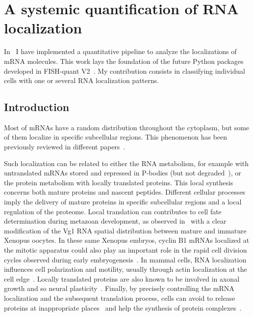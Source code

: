 \section{A systemic quantification of RNA localization}
\label{sec:general_pattern_recognition}

In~\cite{CHOUAIB_2020} I have implemented a quantitative pipeline to analyze the localizations of \ac{mRNA} molecules.
This work lays the foundation of the future Python packages developed in FISH-quant V2~\cite{Imbert_fq_2022}.
My contribution consists in classifying individual cells with one or several \ac{RNA} localization patterns.

\subsection{Introduction}
\label{subsec:introduction_general_pattern}

Most of \ac{mRNA}s have a random distribution throughout the cytoplasm, but some of them localize in specific subcellular regions.
This phenomenon has been previously reviewed in different papers~\cite{Blower_2013, Jung_2014, Eliscovich_2017, Bovaird_2018}.

Such localization can be related to either the \ac{RNA} metabolism, for example with untranslated \ac{mRNA}s stored and repressed in \ac{P-bodies} (but not degraded~\cite{Hubstenberger_2017}), or the protein metabolism with locally translated proteins.
This local synthesis concerns both mature proteins and nascent peptides.
Different cellular processes imply the delivery of mature proteins in specific subcellular regions and a local regulation of the proteome.
Local translation can contributes to cell fate determination during metazoan development, as observed in~\cite{melton_translocation_1987} with a clear modification of the Vg1 \ac{RNA} spatial distribution between mature and immature Xenopus oocytes.
In these same Xenopus embryos, cyclin B1 \ac{mRNA}s localized at the mitotic apparatus could also play an important role in the rapid cell division cycles observed during early embryogenesis~\cite{Groisman_2000}.
In mammal cells, \ac{RNA} localization influences cell polarization and motility, usually through actin localization at the cell edge~\cite{Lawrence_1986}.
Locally translated proteins are also known to be involved in axonal growth and so neural plasticity~\cite{VanDriesche_2018}.
Finally, by precisely controlling the \ac{mRNA} localization and the subsequent translation process, cells can avoid to release proteins at inappropriate places~\cite{Muller_myelin_2013} and help the synthesis of protein complexes~\cite{pichon_visualization_2016}.

